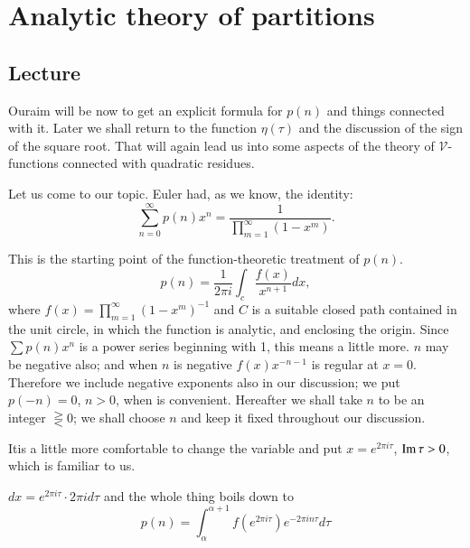 \part{Analytic theory of partitions}\label{part3} %

\chapter{Lecture}\label{part3:lec16} %

Our\pageoriginale aim will be now to get an explicit formula for
$p(n)$ and things connected with it. Later we shall return to the
function $\eta (\tau)$ and the discussion of the sign of the square
root. That will again lead us into some aspects of the theory of
$\mathscr{V}$-functions connected with quadratic residues. 

Let us come to our topic. Euler had, as we know, the identity:
$$
\sum^\infty_{n=0} p(n) x^n = \frac{1}{\prod\limits^\infty_{m=1} (1-x^m)}.
$$

This is the starting point of the function-theoretic treatment of
$p(n)$. 
$$
p(n)= \frac{1}{2 \pi i} \int_c \frac{f(x)}{x^{n+1}} dx,
$$
where $f(x) = \prod\limits^\infty_{m=1} (1-x^m)^{-1}$ and $C$ is a
suitable closed path contained in the unit circle, in which the
function is analytic, and enclosing the origin. Since $\sum p(n) x^n$
is a power series beginning with 1, this means a little more. $n$ may
be negative also; and when $n$ is negative $f(x) x^{-n-1}$ is regular
at $x=0$. Therefore we include negative exponents also in our
discussion; we put $p(-n) =0$, $n> 0$, when is convenient. Hereafter
we shall take $n$ to be an integer $\gtreqless 0$; we shall choose $n$
and keep it fixed throughout our discussion.

It\pageoriginale is a little more comfortable to change the variable
and put $x= e^{2 \pi i \tau}$, $\operatorname{Im} \tau > 0$, which is familiar to us.

$dx= e^{2 \pi i \tau}\cdot 2 \pi i d \tau$ and the whole thing boils
down to 
$$
p(n) = \int_\alpha^{\alpha+1} f(e^{2 \pi i \tau}) e^{- 2 \pi i n \tau}
d \tau
$$
\begin{figure}[H]
\end{figure}

